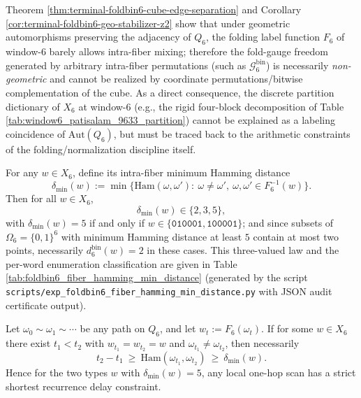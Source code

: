 \begin{enumerate}
  \begin{remark}\label{rem:terminal-foldbin6-geo-vs-gauge}
  Theorem \ref{thm:terminal-foldbin6-cube-edge-separation} and Corollary \ref{cor:terminal-foldbin6-geo-stabilizer-z2} show that under geometric automorphisms preserving the adjacency of \(Q_6\), the folding label function \(F_6\) of window-\(6\) barely allows intra-fiber mixing; therefore the fold-gauge freedom generated by arbitrary intra-fiber permutations (such as \(\mathcal{G}^{\mathrm{bin}}_6\)) is necessarily \emph{non-geometric} and cannot be realized by coordinate permutations/bitwise complementation of the cube.
  As a direct consequence, the discrete partition dictionary of \(X_6\) at window-\(6\) (e.g., the rigid four-block decomposition of Table \ref{tab:window6_patisalam_9633_partition}) cannot be explained as a labeling coincidence of \(\mathrm{Aut}(Q_6)\), but must be traced back to the arithmetic constraints of the folding/normalization discipline itself.
  \end{remark}

  \begin{theorem}\label{thm:terminal-foldbin6-fiber-hamming-three-valued}
  For any \(w\in X_6\), define its intra-fiber minimum Hamming distance
  \[
  \delta_{\min}(w):=\min\bigl\{\mathrm{Ham}(\omega,\omega'):\ \omega\neq \omega',\ \omega,\omega'\in F_6^{-1}(w)\bigr\}.
  \]
  Then for all \(w\in X_6\),
  \[
  \delta_{\min}(w)\in\{2,3,5\},
  \]
  with \(\delta_{\min}(w)=5\) if and only if \(w\in\{\texttt{010001},\texttt{100001}\}\); and since subsets of \(\Omega_6=\{0,1\}^6\) with minimum Hamming distance at least \(5\) contain at most two points, necessarily \(d^{\mathrm{bin}}_6(w)=2\) in these cases.
  This three-valued law and the per-word enumeration classification are given in Table \ref{tab:foldbin6_fiber_hamming_min_distance} (generated by the script \texttt{scripts/exp\_foldbin6\_fiber\_hamming\_min\_distance.py} with JSON audit certificate output).
  \end{theorem}
  

  \begin{corollary}\label{cor:terminal-foldbin6-min-return-delay}
  Let \(\omega_0\sim\omega_1\sim\cdots\) be any path on \(Q_6\), and let \(w_t:=F_6(\omega_t)\).
  If for some \(w\in X_6\) there exist \(t_1<t_2\) with \(w_{t_1}=w_{t_2}=w\) and \(\omega_{t_1}\neq \omega_{t_2}\), then necessarily
  \[
  t_2-t_1\ \ge\ \mathrm{Ham}(\omega_{t_1},\omega_{t_2})\ \ge\ \delta_{\min}(w).
  \]
  Hence for the two types \(w\) with \(\delta_{\min}(w)=5\), any local one-hop scan has a strict shortest recurrence delay constraint.
  \end{corollary}


\end{enumerate}

